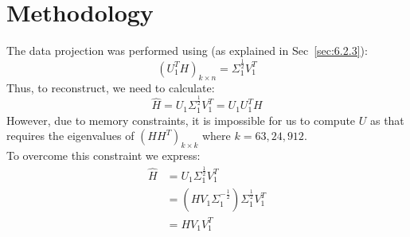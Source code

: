 \documentclass[a4paper,11pt]{article}
\begin{document}
\section{Methodology}
The data projection was performed using (as explained in Sec~\ref{sec:6.2.3}):\\
\begin{displaymath}
    (U_1^TH)_{k\times n} = \Sigma_1^{\frac{1}{2}}V_1^T
\end{displaymath}
Thus, to reconstruct, we need to calculate:
\begin{displaymath}
    \hat{H} = U_1\Sigma_1^{\frac{1}{2}}V_1^T = U_1U_1^TH
\end{displaymath}
However, due to memory constraints, it is impossible for us to compute $U$ as that requires the eigenvalues of $(HH^T)_{k \times k}$ where $k = 63,24,912$.\\
To overcome this constraint we express:
\begin{align*}
    \hat{H} &= U_1\Sigma_1^{\frac{1}{2}}V_1^T\\
    &= (HV_1\Sigma_1^{-\frac{1}{2}})\Sigma_1^{\frac{1}{2}}V_1^T\\
    &= HV_1V_1^T
\end{align*}
\end{document}
